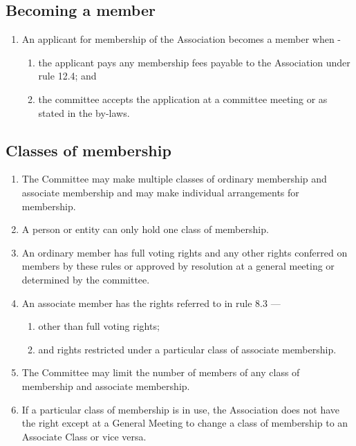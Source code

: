 \documentclass[../constitution.tex]{subfiles}
\begin{document}
\subsection{Becoming a member} \label{becoming-a-member}

\begin{enumerate}

\item An applicant for membership of the Association becomes a member when -

  \begin{enumerate}
  
  \item the applicant pays any membership fees payable to the Association under rule 12.4; and
  \item the committee accepts the application at a committee meeting or as stated in the by-laws.
  \end{enumerate}
\end{enumerate}

\subsection{Classes of membership} \label{classes-of-membership}

\begin{enumerate}
\item The Committee may make multiple classes of ordinary membership and associate membership and may make individual arrangements for membership.
\item A person or entity can only hold one class of membership.
\item An ordinary member has full voting rights and any other rights conferred on members by these rules or approved by resolution at a general meeting or determined by the committee.
\item An associate member has the rights referred to in rule 8.3 ---

  \begin{enumerate}
  \item other than full voting rights;
  \item and rights restricted under a particular class of associate membership.
  \end{enumerate}
\item The Committee may limit the number of members of any class of membership and associate membership.
\item If a particular class of membership is in use, the Association does not have the right except at a General Meeting to change a class of membership to an Associate Class or vice versa.
\end{enumerate}
\end{document}
